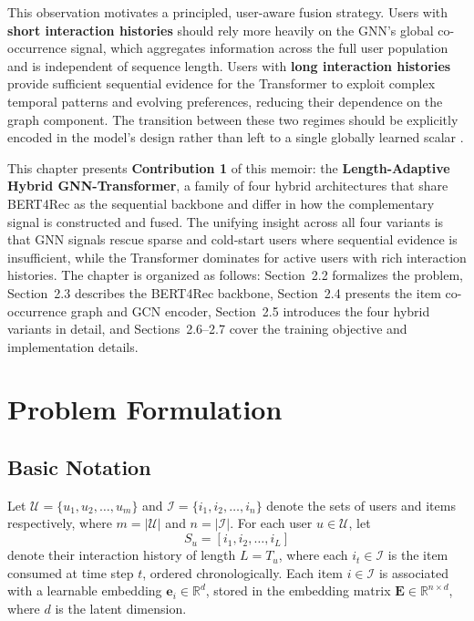\documentclass[12pt,a4paper]{report}
\newcommand{\parencite}[1]{\citep{#1}}
\begin{document}
This observation motivates a principled, user-aware fusion
strategy. Users with \textbf{short interaction histories} should
rely more heavily on the GNN's global co-occurrence signal, which
aggregates information across the full user population and is
independent of sequence length. Users with \textbf{long interaction
histories} provide sufficient sequential evidence for the
Transformer to exploit complex temporal patterns and evolving
preferences, reducing their dependence on the graph component.
The transition between these two regimes should be explicitly
encoded in the model's design rather than left to a single
globally learned scalar \parencite{ouledmeriem2025hybrid}.

This chapter presents \textbf{Contribution 1} of this memoir: the
\textbf{Length-Adaptive Hybrid GNN-Transformer}, a family of four
hybrid architectures that share BERT4Rec as the sequential backbone
and differ in how the complementary signal is constructed and fused.
The unifying insight across all four variants is that GNN signals
rescue sparse and cold-start users where sequential evidence is
insufficient, while the Transformer dominates for active users
with rich interaction histories. The chapter is organized as
follows: Section~2.2 formalizes the problem, Section~2.3 describes
the BERT4Rec backbone, Section~2.4 presents the item co-occurrence
graph and GCN encoder, Section~2.5 introduces the four hybrid
variants in detail, and Sections~2.6--2.7 cover the training
objective and implementation details.


\section{Problem Formulation}

\subsection{Basic Notation}

Let $\mathcal{U} = \{u_1, u_2, \ldots, u_m\}$ and
$\mathcal{I} = \{i_1, i_2, \ldots, i_n\}$ denote the sets of
users and items respectively, where $m = |\mathcal{U}|$ and
$n = |\mathcal{I}|$. For each user $u \in \mathcal{U}$, let
\begin{equation}
  S_u = [i_1, i_2, \ldots, i_L]
\end{equation}
denote their interaction history of length $L = T_u$, where each
$i_t \in \mathcal{I}$ is the item consumed at time step $t$,
ordered chronologically. Each item $i \in \mathcal{I}$ is
associated with a learnable embedding $\mathbf{e}_i \in \mathbb{R}^d$,
stored in the embedding matrix $\mathbf{E} \in \mathbb{R}^{n \times d}$,
where $d$ is the latent dimension.
\end{document}
